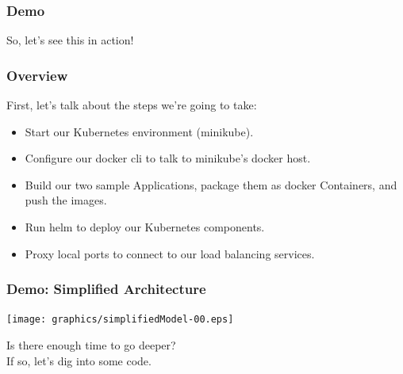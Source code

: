 \documentclass{beamer}
\begin{document}
\begin{frame}
    \frametitle{Demo}
    \begin{center}
        \Huge So, let's see this in action!
    \end{center}
\end{frame}

\begin{frame}
    \frametitle{Overview}
    First, let's talk about the steps we're going to take:
    \begin{itemize}
        \item Start our Kubernetes environment (minikube).\pause
        \item Configure our docker cli to talk to minikube's docker host.\pause
        \item Build our two sample Applications, package them as docker Containers, and push the images.\pause
        \item Run helm to deploy our Kubernetes components.\pause
        \item Proxy local ports to connect to our load balancing services.
    \end{itemize}
\end{frame}

\begin{frame}
    \frametitle{Demo: Simplified Architecture}
    \texttt{[image: graphics/simplifiedModel-00.eps]}
\end{frame}

\begin{frame}
    \begin{center}
        \Huge Is there enough time to go deeper?\\
        If so, let's dig into some code.
    \end{center}
\end{frame}
\end{document}
